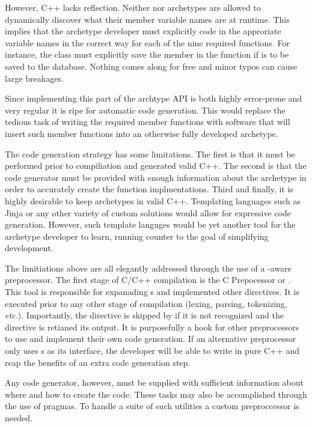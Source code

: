 However, C++ lacks reflection. Neither  nor archetypes are allowed
to dynamically discover what their member variable names are at runtime.  This 
implies that the archetype developer must explicitly code in the approriate variable
names in the correct way for each of the nine required functions.  For instance, 
the  class must explicitly save the  member in the 
 function if  is to be saved to the database.
Nothing comes along for free and minor typos can cause large breakages. 

Since implementing this part of the archtype API is both highly error-prone and 
very regular it is ripe for automatic code generation. This would replace the 
tedious task of writing the required member functions with software that will 
insert such member functions into an otherwise fully developed archetype. 

The code generation strategy has some limitations. The first is that it must be 
performed prior to compiliation and generated valid C++. The second is that the 
code generator must be provided with enough information about the archetype in 
order to accurately create the function implmentations. Third and finally, it 
is highly desirable to keep archetypes in valid C++. Templating languages 
such as Jinja \citeme or any other variety of custom solutions would allow for 
expressive code generation. However, such template languges would be yet another 
tool for the archetype developer to learn, running counter to the goal of 
simplifying development.

The limitiations above are all elegantly addressed through the use of a 
\cyclus-aware preprocessor. The first stage of C/C++ compilation is the 
C Prepocessor or  \citeme. This tool is responsible for expanading 
s and implemented other \code{#} directives. It is executed
prior to any other stage of compilation (lexing, parsing, tokenizing, \emph{etc.}).
Importantly, the  directive is skipped by  if it is not 
recognized and the directive is retianed its output. It is purposefully a 
hook for other preprocessors to use and implement their own code generation.
If an alternative preprocessor only uses s as its interface, 
the developer will be able to write in pure C++ and reap the benefits
of an extra code generation step. 

Any code generator, however, must be supplied with sufficient information about
where and how to create the code. These tasks may also be accomplished through 
the use of pragmas. To handle a suite of such utilities a custom preproccessor
is needed.

